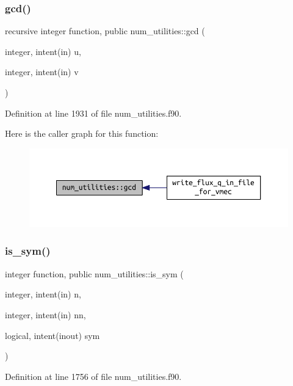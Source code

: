 \subsubsection{\texorpdfstring{gcd()}{gcd()}}
{\footnotesize\ttfamily recursive integer function, public num\+\_\+utilities\+::gcd (\begin{DoxyParamCaption}\item[{integer, intent(in)}]{u,  }\item[{integer, intent(in)}]{v }\end{DoxyParamCaption})}



Definition at line 1931 of file num\+\_\+utilities.\+f90.

Here is the caller graph for this function\+:
\nopagebreak
\begin{figure}[H]
\begin{center}
\leavevmode
\includegraphics[width=350pt]{namespacenum__utilities_a3d0d04a582b3a528fc7f9975d5d2a807_icgraph}
\end{center}
\end{figure}
\mbox{\label{namespacenum__utilities_a4e6994b5c92b3d16c8538b54db0beadd}} 
\subsubsection{\texorpdfstring{is\+\_\+sym()}{is\_sym()}}
{\footnotesize\ttfamily integer function, public num\+\_\+utilities\+::is\+\_\+sym (\begin{DoxyParamCaption}\item[{integer, intent(in)}]{n,  }\item[{integer, intent(in)}]{nn,  }\item[{logical, intent(inout)}]{sym }\end{DoxyParamCaption})}



Definition at line 1756 of file num\+\_\+utilities.\+f90.

